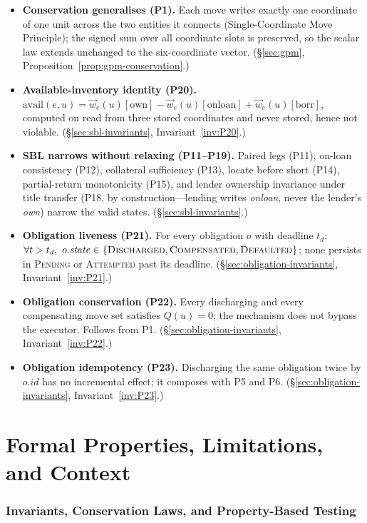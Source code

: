 \documentclass[11pt,a4paper]{article}
\begin{document}
\begin{itemize}[nosep]
\item \textbf{Conservation generalises (P1).} Each move writes exactly one coordinate of
one unit across the two entities it connects (Single-Coordinate Move Principle); the signed
sum over all coordinate slots is preserved, so the scalar law extends unchanged to the
six-coordinate vector. (\S\ref{sec:gpm}, Proposition~\ref{prop:gpm-conservation}.)
\item \textbf{Available-inventory identity (P20).}
$\mathrm{avail}(e,u)=\vec w_e(u)[\mathrm{own}]-\vec w_e(u)[\mathrm{onloan}]+\vec
w_e(u)[\mathrm{borr}]$, computed on read from three stored coordinates and never stored,
hence not violable. (\S\ref{sec:sbl-invariants}, Invariant~\ref{inv:P20}.)
\item \textbf{SBL narrows without relaxing (P11--P19).} Paired legs (P11), on-loan
consistency (P12), collateral sufficiency (P13), locate before short (P14), partial-return
monotonicity (P15), and lender ownership invariance under title transfer (P18, by
construction---lending writes \emph{onloan}, never the lender's \emph{own}) narrow the
valid states. (\S\ref{sec:sbl-invariants}.)
\item \textbf{Obligation liveness (P21).} For every obligation $o$ with deadline $t_d$:
$\forall t>t_d,\ o.\mathit{state}\in\{\textsc{Discharged},\textsc{Compensated},\textsc{Defaulted}\}$;
none persists in \textsc{Pending} or \textsc{Attempted} past its deadline.
(\S\ref{sec:obligation-invariants}, Invariant~\ref{inv:P21}.)
\item \textbf{Obligation conservation (P22).} Every discharging and every compensating move
set satisfies $Q(u)=0$; the mechanism does not bypass the executor. Follows from P1.
(\S\ref{sec:obligation-invariants}, Invariant~\ref{inv:P22}.)
\item \textbf{Obligation idempotency (P23).} Discharging the same obligation twice by
$o.\mathit{id}$ has no incremental effect; it composes with P5 and P6.
(\S\ref{sec:obligation-invariants}, Invariant~\ref{inv:P23}.)
\end{itemize}


\part{Formal Properties, Limitations, and Context}
\section{Invariants, Conservation Laws, and Property-Based Testing}
\label{sec:invariants}
\end{document}
